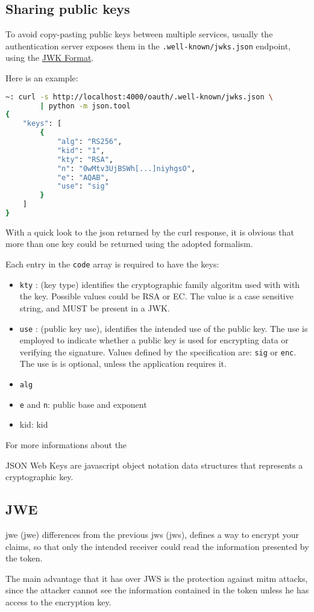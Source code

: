 \subsection{Sharing public keys}
\label{jwks}
To avoid copy-pasting public keys between multiple services, usually the authentication
server exposes them in the \texttt{.well-known/jwks.json} endpoint, using the
\href{https://tools.ietf.org/html/rfc7517#section-4}{JWK Format}.

Here is an example:

\begin{lstlisting}[language=bash]
~: curl -s http://localhost:4000/oauth/.well-known/jwks.json \
        | python -m json.tool
{
    "keys": [
        {
            "alg": "RS256",
            "kid": "1",
            "kty": "RSA",
            "n": "0wMtv3UjBSWh[...]niyhgsO",
            "e": "AQAB",
            "use": "sig"
        }
    ]
}
\end{lstlisting}
With a quick look to the json returned by the curl response, it is obvious that
more than one key could be returned using the adopted formalism.

Each entry in the \texttt{code} array is required to have the keys:
\begin{itemize}
    \item \texttt{kty} : (key type) identifies the cryptographic family algoritm
        used with with the key. Possible values could be RSA or EC.
        The value is a case sensitive string, and MUST be present in a JWK.
    \item \texttt{use} : (public key use), identifies the intended use of the
        public key. The use is employed to indicate whether a public key is used
        for encrypting data or verifying the signature. Values defined by the
        specification are: \texttt{sig} or \texttt{enc}.
        The use is is optional, unless the application requires it.
    \item \texttt{alg}
    \item \texttt{e} and \texttt{n}: public base and exponent
    \item \acs{kid}: \acl{kid}
\end{itemize}

For more informations about the

JSON Web Keys are javascript object notation data structures that represents a
cryptographic key.

\subsection{JWE}
\acs{jwe} (\acl{jwe}) differences from the previous \acs{jws} (\acl{jws}),
defines a way to encrypt your claims, so that only the intended
receiver could read the information presented by the token.

The main advantage that it has over JWS is the protection against \acs{mitm} attacks,
since the attacker cannot see the information contained in the token unless he
has access to the encryption key.
